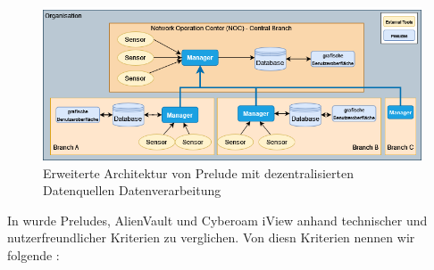 \begin{figure}[H]
   \centering
   \includegraphics[width=1\textwidth]{assets/Branch_Prelude.drawio.png}
   \caption[Erweiterte Architektur von Prelude mit dezentralisierten Datenquellen und Datenverarbeitung]
   {Erweiterte Architektur von Prelude mit dezentralisierten Datenquellen Datenverarbeitung}
   \label{fig:Prelude_erweitert}
   \centering
\end{figure}






In \citep{Grammatikis_Prelude} wurde Preludes, AlienVault und Cyberoam iView anhand technischer und nutzerfreundlicher Kriterien zu verglichen. Von diesn Kriterien nennen wir folgende \citep{Grammatikis_Prelude}:

